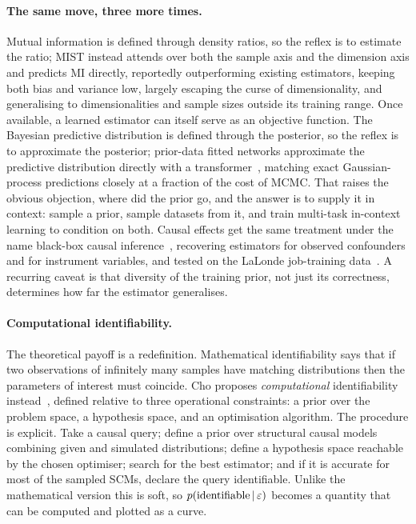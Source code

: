 \paragraph{The same move, three more times.} Mutual information is defined through density
ratios, so the reflex is to estimate the ratio; MIST instead attends over both the sample
axis and the dimension axis and predicts MI directly, reportedly outperforming existing
estimators, keeping both bias and variance low, largely escaping the curse of dimensionality,
and generalising to dimensionalities and sample sizes outside its training range. Once available,
a learned estimator can itself serve as an objective function. The Bayesian predictive
distribution is defined through the posterior, so the reflex is to approximate the posterior;
prior-data fitted networks approximate the predictive distribution directly with a
transformer~\citep{muller2022pfn}, matching exact Gaussian-process predictions closely at a
fraction of the cost of MCMC. That raises the obvious objection, where did the prior go, and
the answer is to supply it in context: sample a prior, sample datasets from it, and train
multi-task in-context learning to condition on both. Causal effects get the same treatment
under the name black-box causal inference~\citep{bynum2025bbci}, recovering estimators for observed
confounders and for instrument variables, and tested on the LaLonde job-training
data~\citep{lalonde1986}. A
recurring caveat is that diversity of the training prior, not just its correctness,
determines how far the estimator generalises.

\paragraph{Computational identifiability.} The theoretical payoff is a redefinition.
Mathematical identifiability says that if two observations of infinitely many samples have
matching distributions then the parameters of interest must coincide. Cho proposes
\emph{computational} identifiability instead~\citep{bynum2026identifiability}, defined relative to
three operational constraints: a prior over the problem space, a hypothesis space, and an optimisation
algorithm. The procedure is explicit. Take a causal query; define a prior over structural
causal models combining given and simulated distributions; define a hypothesis space
reachable by the chosen optimiser; search for the best estimator; and if it is accurate for most of
the sampled SCMs, declare the query identifiable. Unlike the mathematical version this is
soft, so $p(\text{identifiable} \,|\, \varepsilon)$ becomes a quantity that can be computed and
plotted as a curve.

